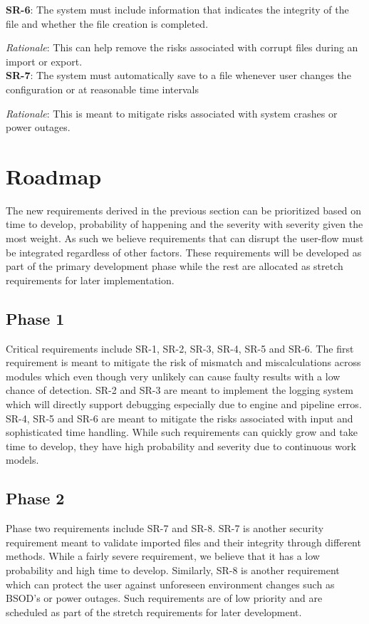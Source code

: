\documentclass{article}
\begin{document}
\textbf{SR-6}:
The system must include information that indicates the integrity of the file and whether the file creation is completed.

\emph{Rationale}: This can help remove the risks associated with corrupt files during an import or export. \\

\textbf{SR-7}:
The system must automatically save to a file whenever user changes the configuration or at reasonable time intervals

\emph{Rationale}: This is meant to mitigate risks associated with system crashes or power outages.\\



\section{Roadmap}

The new requirements derived in the previous section can be prioritized based on time to develop, probability of happening and the severity with severity given the most weight. As such we believe requirements that can disrupt the user-flow must be integrated regardless of other factors. These requirements will be developed as part of the primary development phase while the rest are allocated as stretch requirements for later implementation. 

\subsection{Phase 1}
Critical requirements include SR-1, SR-2, SR-3, SR-4, SR-5 and SR-6. The first requirement is meant to mitigate the risk of mismatch and miscalculations across modules which even though very unlikely can cause faulty results with a low chance of detection. SR-2 and SR-3 are meant to implement the logging system which will directly support debugging especially due to engine and pipeline erros. SR-4, SR-5 and SR-6 are meant to mitigate the risks associated with input and sophisticated time handling. While such requirements can quickly grow and take time to develop, they have high probability and severity due to continuous work models. 
\subsection{Phase 2}
Phase two requirements include SR-7 and SR-8. SR-7 is another security requirement meant to validate imported files and their integrity through different methods. While a fairly severe requirement, we believe that it has a low probability and high time to develop. Similarly, SR-8 is another requirement which can protect the user against unforeseen environment changes such as BSOD’s or power outages. Such requirements are of low priority and are scheduled as part of the stretch requirements for later development. 
\end{document}
